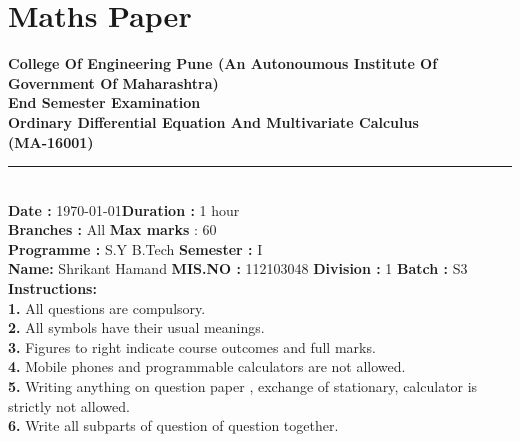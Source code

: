 \documentclass[12pt]{article}
\begin{document}
\section{ Maths Paper}
\vspace{10mm}
\begin{center}
\huge \bf {College Of Engineering Pune} 
\linebreak \small{(An Autonoumous Institute Of Government Of Maharashtra)}\\
\vspace{10mm}
\large \textbf{End Semester Examination} \\  Ordinary Differential Equation And Multivariate Calculus
\\ (MA-16001)
\end{center}
\par\noindent\rule{\textwidth}{1pt}
\\
\vspace{5mm}
\noindent \textbf{Date :} \today \hfill \textbf {Duration :} 1 hour
\\ \textbf {Branches :} All \hfill  \textbf {Max marks} : 60
\\ \textbf {Programme :} S.Y B.Tech \hfill \textbf {Semester :} I
\linebreak
\linebreak
\\ \textbf {Name:} Shrikant Hamand \hfill \textbf{MIS.NO : }112103048
\linebreak
\linebreak
\textbf{Division :} 1 \hfill \textbf{Batch :}  S3
\linebreak
\\ \textbf{Instructions:}
\linebreak
\\ \textbf{1.} All questions are compulsory.
\\ \textbf{2.} All symbols have their usual meanings.
\\ \textbf{3.} Figures to right indicate course outcomes and full marks.
\\ \textbf{4.} Mobile phones and programmable calculators are not allowed.
\\ \textbf{5.} Writing anything on question paper , exchange of stationary, calculator is strictly not allowed.
\\ \textbf{6.} Write all subparts of question of question together.
\newpage
\newpage
\end{document}
